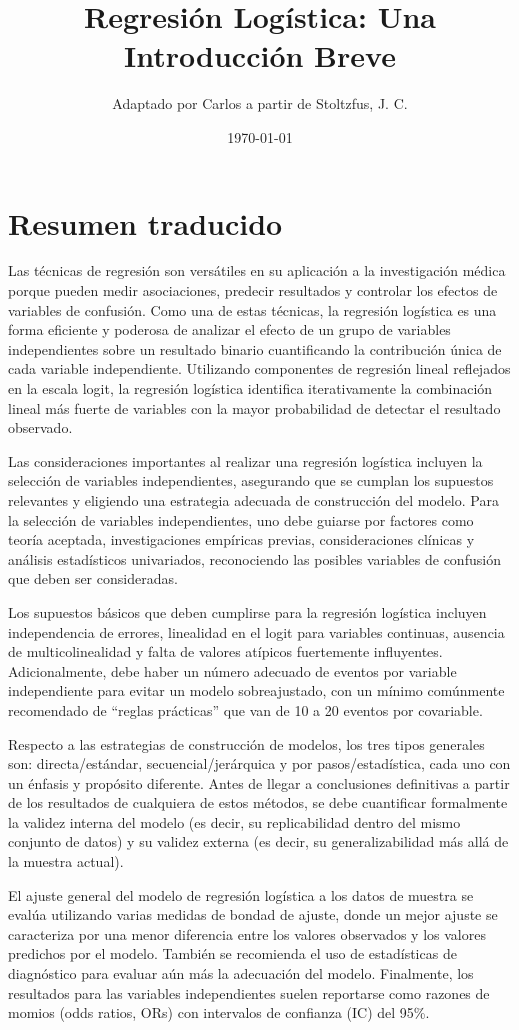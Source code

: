 \documentclass[12pt]{article}
\title{Regresión Logística: Una Introducción Breve}
\author{Adaptado por Carlos a partir de Stoltzfus, J. C.}
\date{\today}
\begin{document}
\maketitle

\section*{Resumen traducido}

Las técnicas de regresión son versátiles en su aplicación a la investigación médica porque pueden medir asociaciones, predecir resultados y controlar los efectos de variables de confusión. Como una de estas técnicas, la regresión logística es una forma eficiente y poderosa de analizar el efecto de un grupo de variables independientes sobre un resultado binario cuantificando la contribución única de cada variable independiente. Utilizando componentes de regresión lineal reflejados en la escala logit, la regresión logística identifica iterativamente la combinación lineal más fuerte de variables con la mayor probabilidad de detectar el resultado observado.

Las consideraciones importantes al realizar una regresión logística incluyen la selección de variables independientes, asegurando que se cumplan los supuestos relevantes y eligiendo una estrategia adecuada de construcción del modelo. Para la selección de variables independientes, uno debe guiarse por factores como teoría aceptada, investigaciones empíricas previas, consideraciones clínicas y análisis estadísticos univariados, reconociendo las posibles variables de confusión que deben ser consideradas. 

Los supuestos básicos que deben cumplirse para la regresión logística incluyen independencia de errores, linealidad en el logit para variables continuas, ausencia de multicolinealidad y falta de valores atípicos fuertemente influyentes. Adicionalmente, debe haber un número adecuado de eventos por variable independiente para evitar un modelo sobreajustado, con un mínimo comúnmente recomendado de “reglas prácticas” que van de 10 a 20 eventos por covariable.

Respecto a las estrategias de construcción de modelos, los tres tipos generales son: directa/estándar, secuencial/jerárquica y por pasos/estadística, cada uno con un énfasis y propósito diferente. Antes de llegar a conclusiones definitivas a partir de los resultados de cualquiera de estos métodos, se debe cuantificar formalmente la validez interna del modelo (es decir, su replicabilidad dentro del mismo conjunto de datos) y su validez externa (es decir, su generalizabilidad más allá de la muestra actual).

El ajuste general del modelo de regresión logística a los datos de muestra se evalúa utilizando varias medidas de bondad de ajuste, donde un mejor ajuste se caracteriza por una menor diferencia entre los valores observados y los valores predichos por el modelo. También se recomienda el uso de estadísticas de diagnóstico para evaluar aún más la adecuación del modelo. Finalmente, los resultados para las variables independientes suelen reportarse como razones de momios (odds ratios, ORs) con intervalos de confianza (IC) del 95\%.
\end{document}
